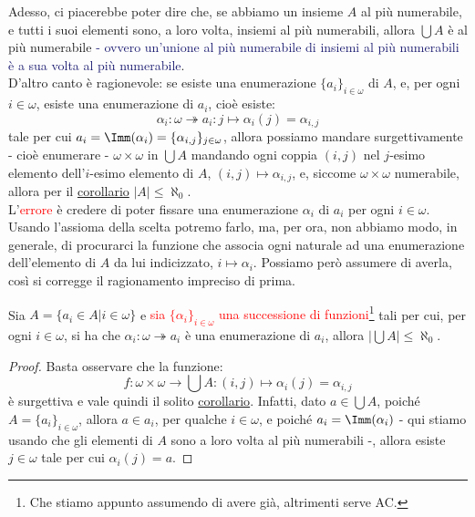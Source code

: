 Adesso, ci piacerebbe poter dire che, se abbiamo un insieme $A$ al più numerabile, e tutti i suoi elementi sono, a loro volta, insiemi al più numerabili, allora
$\bigcup A$ è al più numerabile \textcolor{MidnightBlue}{- ovvero un'unione al più numerabile di insiemi al più numerabili è a sua volta al più numerabile}.\\
D'altro canto è ragionevole: se esiste una enumerazione $\{a_i\}_{i \in \omega}$ di $A$, e, per ogni $i \in \omega$, esiste una enumerazione di $a_i$, cioè esiste:
\[ \alpha_i : \omega \twoheadrightarrow a_i : j \mapsto \alpha_i(j) = \alpha_{i,j}
	\]
tale per cui $a_i = \Imm(\alpha_i) = \{\alpha_{i,j}\}_{j \in \omega}$, allora possiamo mandare surgettivamente - cioè enumerare - $\omega \times \omega$ in $\bigcup A$ mandando ogni coppia $(i,j)$ nel $j$-esimo elemento dell'$i$-esimo elemento di $A$, $(i,j) \mapsto \alpha_{i,j}$,
e, siccome $\omega \times \omega$ numerabile, allora per il \hyperref[disugcardnum]{corollario} $|A| \leq \aleph_0$.\\
L'\textcolor{red}{errore} è credere di poter fissare una enumerazione $\alpha_i$ di $a_i$ per ogni $i \in \omega$. Usando l'assioma della scelta potremo farlo, ma, per ora, non abbiamo modo, in generale, di procurarci la funzione che associa ogni naturale ad una enumerazione dell'elemento di $A$ da lui indicizzato, $i \mapsto \alpha_i$.
Possiamo però assumere di averla, così si corregge il ragionamento impreciso di prima.

\begin{proposition}
	Sia $A = \{a_i \in A| i \in \omega\}$ e \textcolor{red}{sia $\{\alpha_i\}_{i \in \omega}$ una successione di funzioni}\footnote{Che stiamo appunto assumendo di avere già, altrimenti serve AC.} tali per cui,
	per ogni $i \in \omega$, si ha che $\alpha_i : \omega \twoheadrightarrow a_i$ è una enumerazione di $a_i$, allora $\left|\bigcup A\right| \leq \aleph_0$.
\end{proposition}

\begin{proof}
	Basta osservare che la funzione:
	\[ f : \omega \times \omega \to \bigcup A : (i,j) \mapsto \alpha_i(j) = \alpha_{i,j}
		\]
	è surgettiva e vale quindi il solito \hyperref[disugcardnum]{corollario}. Infatti, dato $a \in \bigcup A$,
	poiché $A = \{a_i\}_{i \in \omega}$, allora $a \in a_i$, per qualche $i \in \omega$, e poiché $a_i = \Imm(\alpha_i)$ - qui stiamo usando che gli elementi di $A$ sono a loro volta al più numerabili -,
 	allora esiste $j \in \omega$ tale per cui $\alpha_i(j) = a$.
\end{proof}

